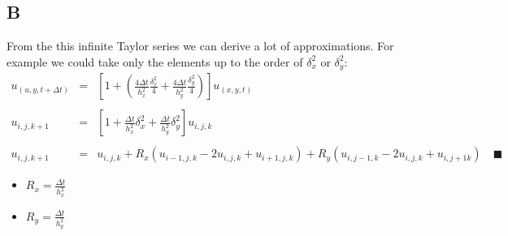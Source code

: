 \documentclass[11pt, a4paper]{article}
\begin{document}
\subsection{B}
From the this infinite Taylor series we can derive a lot of approximations. For example we could take only the elements up to the order of $\delta_x^2$ or $\delta_y^2$: 
\begin{equation}
    \begin{array}{rcl}
        \displaystyle u_{\left(u,y,t+\Delta t\right)} & = & \displaystyle \left[1+\left(\frac{4\Delta t}{h_x^2}\frac{\delta_x^2}{4}+\frac{4\Delta t}{h_y^2}\frac{\delta_y^2}{4}\right)\right]u_{\left(x,y,t\right)} \\\\
        \displaystyle u_{i,j,k+1} & = & \displaystyle \left[1+\frac{\Delta t}{h_x^2}\delta_x^2+\frac{\Delta t}{h_y^2}\delta^2_y\right]u_{i,j,k} \\\\
        \displaystyle u_{i,j,k+1} & = & \displaystyle u_{i,j,k}+R_x\left(u_{i-1,j,k}-2u_{i,j,k}+u_{i+1,j,k}\right)+R_y\left(u_{i,j-1,k}-2u_{i,j,k}+u_{i,j+1k}\right)\quad\blacksquare
    \end{array}
\end{equation}
\begin{itemize}
    \item $\displaystyle R_x=\frac{\Delta t}{h_x^2}$
    \item $\displaystyle R_y=\frac{\Delta t}{h_y^2}$
\end{itemize}
\end{document}
